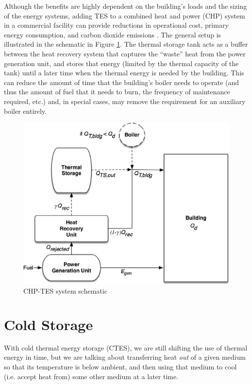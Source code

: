 \documentclass[10pt]{article}
\begin{document}
Although the benefits are highly dependent on the building's loads and the sizing of the energy systems, adding TES to a combined heat and power (CHP) system in a commercial facility can provide reductions in operational cost, primary energy consumption, and carbon dioxide emissions \cite{Smith2013-xo}. The general setup is illustrated in the schematic in Figure \ref{CHP-TES}. The thermal storage tank acts as a buffer between the heat recovery system that captures the ``waste'' heat from the power generation unit, and stores that energy (limited by the thermal capacity of the tank) until a later time when the thermal energy is needed by the building. This can reduce the amount of time that the building's boiler needs to operate (and thus the amount of fuel that it needs to burn, the frequency of maintenance required, etc.) and, in special cases, may remove the requirement for an auxiliary boiler entirely. 


\begin{figure}[h]
\centering
\includegraphics[width=4.5in]{extras32/CHP-tes.jpg}
\caption{CHP-TES system schematic \cite{Rahman2018-yc}}
\label{CHP-TES}
\end{figure}


\section{Cold Storage}
\label{coldTES}

With cold thermal energy storage (CTES), we are still shifting the use of thermal energy in time, but we are talking about transferring heat \textit{out} of a given medium so that its temperature is below ambient, and then using that medium to cool (i.e. accept heat from) some other medium at a later time.
\end{document}
